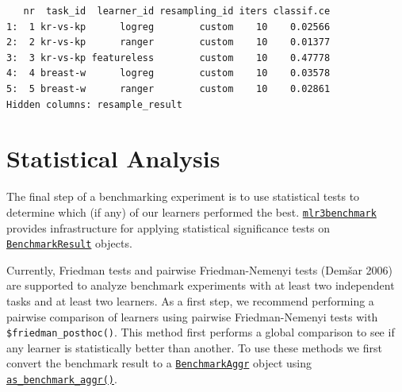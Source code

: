 \begin{verbatim}
   nr  task_id  learner_id resampling_id iters classif.ce
1:  1 kr-vs-kp      logreg        custom    10    0.02566
2:  2 kr-vs-kp      ranger        custom    10    0.01377
3:  3 kr-vs-kp featureless        custom    10    0.47778
4:  4 breast-w      logreg        custom    10    0.03578
5:  5 breast-w      ranger        custom    10    0.02861
Hidden columns: resample_result
\end{verbatim}

\hypertarget{sec-benchmark-analysis}{%
\section{Statistical Analysis}\label{sec-benchmark-analysis}}

The final step of a benchmarking experiment is to use statistical tests
to determine which (if any) of our learners performed the best.
\href{https://mlr3benchmark.mlr-org.com/reference/mlr3benchmark-package.html}{\texttt{mlr3benchmark}}
provides infrastructure for applying statistical significance tests on
\href{https://mlr3.mlr-org.com/reference/BenchmarkResult.html}{\texttt{BenchmarkResult}}
objects.

Currently, Friedman tests and pairwise Friedman-Nemenyi
tests (Demšar 2006) are supported to analyze benchmark experiments with
at least two independent tasks and at least two learners. As a first
step, we recommend performing a pairwise comparison of learners using
pairwise Friedman-Nemenyi tests with \texttt{\$friedman\_posthoc()}.
This method first performs a global comparison to see if any learner is
statistically better than another. To use these methods we first convert
the benchmark result to a
\href{https://mlr3benchmark.mlr-org.com/reference/BenchmarkAggr.html}{\texttt{BenchmarkAggr}}
object using
\href{https://mlr3benchmark.mlr-org.com/reference/as_benchmark_aggr.html}{\texttt{as\_benchmark\_aggr()}}.

\begin{Shaded}
\begin{Highlighting}[]
\OtherTok{=}  \NormalTok{(}\NormalTok{))}
\SpecialCharTok{$}\NormalTok{()}
\end{Highlighting}
\end{Shaded}

